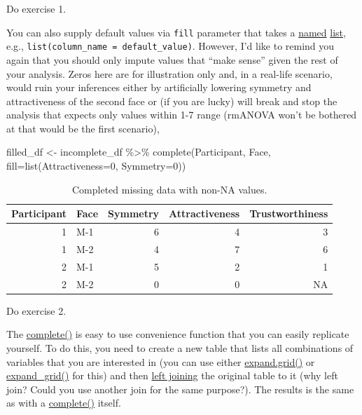 \documentclass[
]{book}
\newenvironment{Shaded}{\begin{snugshade}}{\end{snugshade}}
\newcommand{\AttributeTok}[1]{\textcolor[rgb]{0.77,0.63,0.00}{#1}}
\newcommand{\DecValTok}[1]{\textcolor[rgb]{0.00,0.00,0.81}{#1}}
\newcommand{\FunctionTok}[1]{\textcolor[rgb]{0.00,0.00,0.00}{#1}}
\newcommand{\NormalTok}[1]{#1}
\newcommand{\OtherTok}[1]{\textcolor[rgb]{0.56,0.35,0.01}{#1}}
\newcommand{\SpecialCharTok}[1]{\textcolor[rgb]{0.00,0.00,0.00}{#1}}
\begin{document}
Do exercise 1.

You can also supply default values via \texttt{fill} parameter that takes a \protect\hyperlink{names}{named} \protect\hyperlink{lists}{list}, e.g., \texttt{list(column\_name\ =\ default\_value)}. However, I'd like to remind you again that you should only impute values that ``make sense'' given the rest of your analysis. Zeros here are for illustration only and, in a real-life scenario, would ruin your inferences either by artificially lowering symmetry and attractiveness of the second face or (if you are lucky) will break and stop the analysis that expects only values within 1-7 range (rmANOVA won't be bothered at that would be the first scenario),

\begin{Shaded}
\begin{Highlighting}[]
\NormalTok{filled\_df }\OtherTok{\textless{}{-}} 
\NormalTok{  incomplete\_df }\SpecialCharTok{\%\textgreater{}\%}
  \FunctionTok{complete}\NormalTok{(Participant, Face, }\AttributeTok{fill=}\FunctionTok{list}\NormalTok{(}\AttributeTok{Attractiveness=}\DecValTok{0}\NormalTok{, }\AttributeTok{Symmetry=}\DecValTok{0}\NormalTok{))}
\end{Highlighting}
\end{Shaded}

\begin{table}

\caption{\label{tab:unnamed-chunk-281}Completed missing data with non-NA values.}
\centering
\begin{tabular}[t]{r|l|r|r|r}
\hline
Participant & Face & Symmetry & Attractiveness & Trustworthiness\\
\hline
1 & M-1 & 6 & 4 & 3\\
\hline
1 & M-2 & 4 & 7 & 6\\
\hline
2 & M-1 & 5 & 2 & 1\\
\hline
2 & M-2 & 0 & 0 & NA\\
\hline
\end{tabular}
\end{table}

Do exercise 2.

The \href{https://tidyr.tidyverse.org/reference/complete.html}{complete()} is easy to use convenience function that you can easily replicate yourself. To do this, you need to create a new table that lists all combinations of variables that you are interested in (you can use either \href{https://stat.ethz.ch/R-manual/R-devel/library/base/html/expand.grid.html}{expand.grid()} or \href{https://tidyr.tidyverse.org/reference/expand_grid.html}{expand\_grid()} for this) and then \protect\hyperlink{joins}{left joining} the original table to it (why left join? Could you use another join for the same purpose?). The results is the same as with a \href{https://tidyr.tidyverse.org/reference/complete.html}{complete()} itself.
\end{document}
